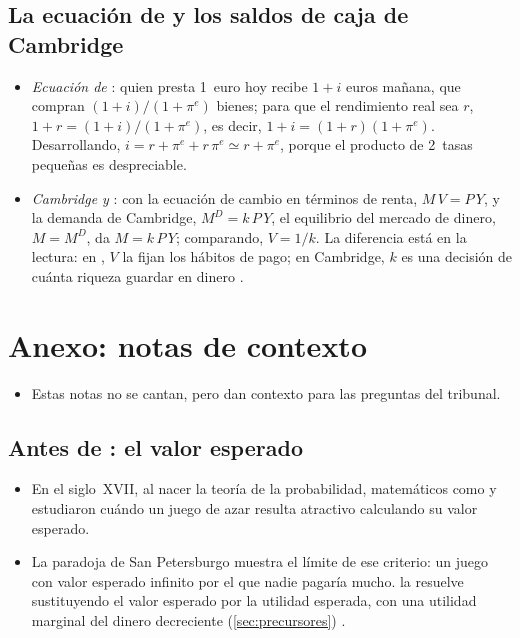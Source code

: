 \documentclass[11pt]{article}
\begin{document}
\subsection{La ecuación de  y los saldos de caja de Cambridge}\label{anexo:fisher}

\begin{itemize}
\item \emph{Ecuación de }: quien presta 1~euro hoy recibe $1+i$ euros mañana, que compran $(1+i)/(1+\pi^e)$ bienes; para que el rendimiento real sea $r$, $1+r=(1+i)/(1+\pi^e)$, es decir, $1+i=(1+r)(1+\pi^e)$. Desarrollando, $i=r+\pi^e+r\,\pi^e\simeq r+\pi^e$, porque el producto de 2~tasas pequeñas es despreciable.
\item \emph{Cambridge y }: con la ecuación de cambio en términos de renta, $M\,V=P\,Y$, y la demanda de Cambridge, $M^D=k\,P\,Y$, el equilibrio del mercado de dinero, $M=M^D$, da $M=k\,P\,Y$; comparando, $V=1/k$. La diferencia está en la lectura: en , $V$ la fijan los hábitos de pago; en Cambridge, $k$ es una decisión de cuánta riqueza guardar en dinero .\findemo
\end{itemize}

\section{Anexo: notas de contexto}\label{anexo:notas}

\begin{itemize}
\item Estas notas no se cantan, pero dan contexto para las preguntas del tribunal.
\end{itemize}

\subsection{Antes de : el valor esperado}\label{anexo:pascal}

\begin{itemize}
\item En el siglo~XVII, al nacer la teoría de la probabilidad, matemáticos como  y  estudiaron cuándo un juego de azar resulta atractivo calculando su valor esperado.
\item La paradoja de San Petersburgo muestra el límite de ese criterio: un juego con valor esperado infinito por el que nadie pagaría mucho.  la resuelve sustituyendo el valor esperado por la utilidad esperada, con una utilidad marginal del dinero decreciente (\ref{sec:precursores}) .
\end{itemize}
\end{document}
